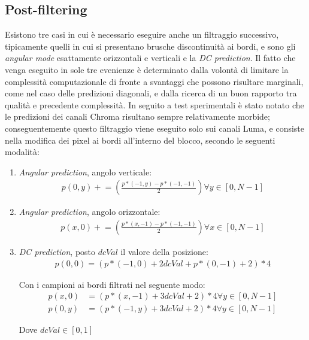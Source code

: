 \subsection{Post-filtering}
Esistono tre casi in cui è necessario eseguire anche un filtraggio successivo, 
tipicamente quelli in cui si presentano brusche discontinuità ai bordi, e sono 
gli \emph{angular mode} esattamente orizzontali e verticali e la 
\emph{DC prediction}.
Il fatto che venga eseguito in sole tre evenienze è determinato dalla volontà 
di limitare la complessità computazionale di fronte a svantaggi che possono 
risultare  marginali, come nel caso delle predizioni diagonali, e dalla ricerca 
di un buon rapporto tra qualità e precedente complessità.
In seguito a test sperimentali è stato notato che le predizioni dei canali 
Chroma risultano sempre relativamente morbide; conseguentemente questo 
filtraggio viene eseguito solo sui canali Luma, e consiste nella modifica dei 
pixel ai bordi all'interno del blocco, secondo le seguenti modalità:
\begin{enumerate}
\item \emph{Angular prediction}, angolo verticale: \\
\begin{align*}
p(0,y)\mathrel{+}=\left(\frac{p*(-1,y)-p*(-1,-1)}{2}\right) 
\forall y \in {[0,N-1]}
\end{align*}

\item \emph{Angular prediction}, angolo orizzontale: \\
\begin{align*}
p(x,0)\mathrel{+}=\left(\frac{p*(x,-1)-p*(-1,-1)}{2}\right) 
\forall x \in {[0,N-1]}
\end{align*}

\item{ \emph{DC prediction}, posto $dcVal$ il valore della posizione: \\
\begin{align*}
p(0,0)=(p*(-1,0)+2dcVal+p*(0,-1)+2)*4
\end{align*}

Con i campioni ai bordi filtrati nel seguente modo:
\begin{align*}
p(x,0)&=(p*(x,-1)+3dcVal+2)*4 \forall y \in {[0,N-1]} \\
p(0,y)&=(p*(-1,y)+3dcVal+2)*4 \forall y \in {[0,N-1]}
\end{align*}

Dove $dcVal \in {[0,1]}$
}
\end{enumerate}

